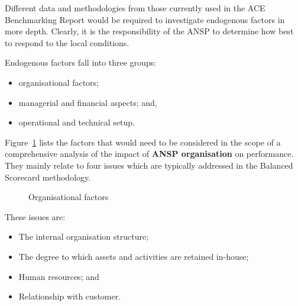 \documentclass[
  11pt,
  a4paperpaper,
  openany,headsepline=on,footsepline=off,DIV=12,table]{scrbook}
\providecommand{\tightlist}{%
  \setlength{\itemsep}{0pt}\setlength{\parskip}{0pt}}\usepackage{longtable,booktabs,array}
\begin{document}
Different data and methodologies from those currently used in the ACE
Benchmarking Report would be required to investigate endogenous factors
in more depth. Clearly, it is the responsibility of the ANSP to
determine how best to respond to the local conditions.

Endogenous factors fall into three groups:

\begin{itemize}
\tightlist
\item
  organisational factors;
\item
  managerial and financial aspects; and,
\item
  operational and technical setup.
\end{itemize}

Figure~\ref{fig-org-factors} lists the factors that would need to be
considered in the scope of a comprehensive analysis of the impact of
\textbf{ANSP organisation} on performance. They mainly relate to four
issues which are typically addressed in the Balanced Scorecard
methodology.

\begin{figure}[H]


\caption{\label{fig-org-factors}Organisational factors}

\end{figure}%

These issues are:

\begin{itemize}
\tightlist
\item
  The internal organisation structure;
\item
  The degree to which assets and activities are retained in-house;\\
\item
  Human resources; and\\
\item
  Relationship with customer.
\end{itemize}
\end{document}
